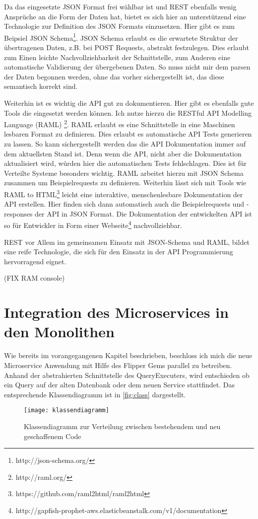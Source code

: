 Da das eingesetzte JSON Format frei wählbar ist und REST ebenfalls wenig Ansprüche an die Form der Daten hat, bietet es sich hier an unterstützend eine Technologie zur Definition des JSON Formats einzusetzen. Hier gibt es zum Beipsiel JSON Schema\footnote{http://json-schema.org/}. JSON Schema erlaubt es die erwartete Struktur der übertragenen Daten, z.B. bei POST Requests, abstrakt festzulegen. Dies erlaubt zum Einen leichte Nachvollziehbarkeit der Schnittstelle, zum Anderen eine automatische Validierung der übergebenen Daten. So muss nicht mir dem parsen der Daten begonnen werden, ohne das vorher sichergestellt ist, das diese semantisch korrekt sind.

Weiterhin ist es wichtig die API gut zu dokumentieren. Hier gibt es ebenfalls gute Tools die eingesetzt werden können. Ich nutze hierzu die RESTful API Modelling Language (RAML) \footnote{http://raml.org/}. RAML erlaubt es eine Schnittstelle in eine Maschinen lesbaren Format zu definieren. Dies erlaubt es automatische API Tests generieren zu lassen. So kann sichergestellt werden das die API Dokumentation immer auf dem aktuellsten Stand ist. Denn wenn die API, nicht aber die Dokumentation aktualisiert wird, würden hier die automatischen Tests fehlschlagen. Dies ist für Verteilte Systeme besonders wichtig. RAML arbeitet hierzu mit JSON Schema zusammen um Beispielrequests zu definieren. Weiterhin lässt sich mit Tools wie RAML to HTML\footnote{https://github.com/raml2html/raml2html} leicht eine interaktive, menschenlesbare Dokumentation der API erstellen. Hier finden sich dann automatisch auch die Beispielrequests und -responses der API in JSON Format. Die Dokumentation der entwickelten API ist so für Entwickler in Form einer Webseite\footnote{http://gapfish-prophet-aws.elasticbeanstalk.com/v1/documentation} nachvollziehbar.

REST vor Allem im gemeinsamen Einsatz mit JSON-Schema und RAML, bildet eine reife Technologie, die sich für den Einsatz in der API Programmierung hervorragend eignet.

(FIX RAM console)

\section{Integration des Microservices in den Monolithen}
Wie bereits im vorangegangenen Kapitel beschrieben, beschloss ich mich die neue Microservice Anwendung mit Hilfe des Flipper Gems parallel zu betreiben. Anhand der abstrahierten Schnittstelle des QueryExecuters, wird entschieden ob ein Query auf der alten Datenbank oder dem neuen Service stattfindet. Das entsprechende Klassendiagramm ist in \autoref{fig:class} dargestellt.
\begin{figure}[!ht]
    \centering
    \caption{Klassendiagramm zur Verteilung zwischen bestehendem und neu geschaffenem Code}
    \label{fig:class}
    \texttt{[image: klassendiagramm]}
\end{figure}

